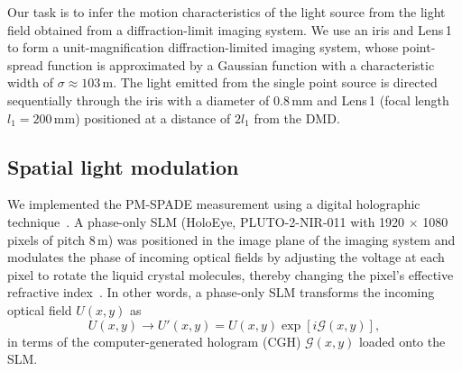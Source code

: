 \documentclass[aps,pra,10pt,showpacs,amsmath,amssymb,floatfix,superscriptaddress,twocolumn]{revtex4-2}
\begin{document}
Our task is to infer the motion characteristics of the light source from the light field obtained from a diffraction-limit imaging system.
We use an iris and Lens\,1 to form a unit-magnification diffraction-limited imaging system,
whose point-spread function is approximated by a Gaussian function with a characteristic width of $\sigma \approx 103$\,{\textmu}m.
The light emitted from the single point source is directed sequentially through the iris with a diameter of 0.8\,mm and Lens\,1 (focal length $l_{1}=200$\,mm) positioned at a distance of $2l_{1}$ from the DMD.


\subsection{Spatial light modulation}

We implemented the PM-SPADE measurement using a digital holographic technique~\cite{supp_Paur2016,supp_Zhou2023}.
A phase-only SLM (HoloEye, PLUTO-2-NIR-011 with 1920 $\times$ 1080 pixels of pitch 8\,{\textmu}m) was positioned in the image plane of the imaging system and modulates the phase of incoming optical fields by adjusting the voltage at each pixel to rotate the liquid crystal molecules, thereby changing the pixel's effective refractive index~\cite{supp_RosalesGuzman2017}.
In other words, a phase-only SLM transforms the incoming optical field \(U(x,y)\) as
\begin{equation}
    U(x,y) \to U'(x,y) = U(x,y)\exp[i\mathcal{G}(x,y)],
\end{equation}
in terms of the computer-generated hologram (CGH) \(\mathcal G(x,y)\) loaded onto the SLM.
\end{document}
